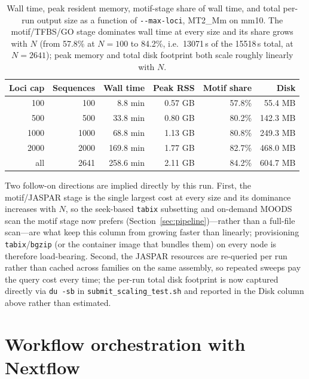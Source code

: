 \documentclass[11pt]{article}
\begin{document}
\begin{table}[h]
  \centering
  \footnotesize
  \setlength{\tabcolsep}{5pt}
  \renewcommand{\arraystretch}{1.2}
  \begin{tabular}{@{}r r r r r r@{}}
    \toprule
    \textbf{Loci cap} & \textbf{Sequences} & \textbf{Wall time} & \textbf{Peak RSS} &
      \textbf{Motif share} & \textbf{Disk} \\
    \midrule
    100  & 100  & 8.8 min   & 0.57 GB & 57.8\% & 55.4 MB \\
    500  & 500  & 33.8 min  & 0.80 GB & 80.2\% & 142.3 MB \\
    1000 & 1000 & 68.8 min  & 1.13 GB & 80.8\% & 249.3 MB \\
    2000 & 2000 & 169.8 min & 1.77 GB & 82.7\% & 468.0 MB \\
    all  & 2641 & 258.6 min & 2.11 GB & 84.2\% & 604.7 MB \\
    \bottomrule
  \end{tabular}
  \caption{Wall time, peak resident memory, motif-stage share of wall time, and total per-run
    output size as a function of \texttt{-{}-max-loci}, MT2\_Mm on mm10. The motif/TFBS/GO stage
    dominates wall time at every size and its share grows with $N$ (from 57.8\% at $N=100$ to
    84.2\%, i.e.\ 13071\,s of the 15518\,s total, at $N=2641$); peak memory and total disk
    footprint both scale roughly linearly with $N$.}
  \label{tab:scaling}
\end{table}

Two follow-on directions are implied directly by this run. First, the motif/JASPAR stage is the
single largest cost at every size and its dominance increases with $N$, so the seek-based
\texttt{tabix} subsetting and on-demand MOODS scan the motif stage now prefers
(Section~\ref{sec:pipeline})---rather than a full-file scan---are what keep this column from
growing faster than linearly; provisioning \texttt{tabix}/\texttt{bgzip} (or the container image
that bundles them) on every node is therefore load-bearing. Second, the JASPAR resources are
re-queried per run rather than cached across families on the same assembly, so repeated sweeps
pay the query cost every time; the per-run total disk footprint is now captured directly via
\texttt{du -sb} in \texttt{submit\_scaling\_test.sh} and reported in the Disk column above rather
than estimated.

\section{Workflow orchestration with Nextflow}
\label{sec:orchestration}
\end{document}
